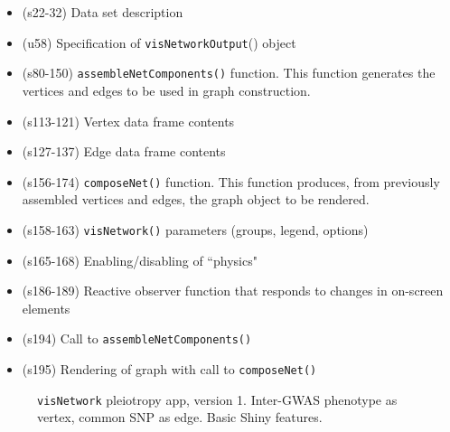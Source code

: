 \documentclass[10pt, letterpaper]{article}
\begin{document}
\begin{spacing}{1.0}
\begin{itemize}
  \item (s22-32) Data set description
  \item (u58) Specification of \texttt{visNetworkOutput}() object
  \item (s80-150) \texttt{assembleNetComponents()} function.  This function generates the vertices and edges to be used in graph construction.
  \item (s113-121) Vertex data frame contents
  \item (s127-137) Edge data frame contents
  \item (s156-174) \texttt{composeNet()} function.  This function produces, from previously assembled vertices and edges, the graph object to be rendered.
  \item (s158-163) \texttt{visNetwork()} parameters (groups, legend, options)
  \item (s165-168) Enabling/disabling of ``physics"
  \item (s186-189) Reactive observer function that responds to changes in on-screen elements
  \item (s194) Call to \texttt{assembleNetComponents()}
  \item (s195) Rendering of graph with call to \texttt{composeNet()} 
\end{itemize}

\begin{figure}[H]
    \centering
    \caption{\texttt{visNetwork} pleiotropy app, version 1.  Inter-GWAS phenotype as vertex, common SNP as edge.  Basic Shiny features.}
    \label{fg:visNetworkAppV1}
\end{figure}


\end{spacing}
\end{document}
